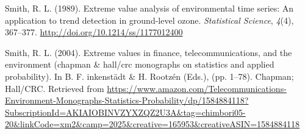 \documentclass[12pt,oneside]{reedthesis}
\begin{document}
\leavevmode\hypertarget{ref-Smith1989}{}%
Smith, R. L. (1989). Extreme value analysis of environmental time series: An application to trend detection in ground-level ozone. \emph{Statistical Science}, \emph{4}(4), 367--377. \url{http://doi.org/10.1214/ss/1177012400}

\leavevmode\hypertarget{ref-Smith2004}{}%
Smith, R. L. (2004). Extreme values in finance, telecommunications, and the environment (chapman \& hall/crc monographs on statistics and applied probability). In B. F. inkenstädt \& H. Rootzén (Eds.), (pp. 1--78). Chapman; Hall/CRC. Retrieved from \url{https://www.amazon.com/Telecommunications-Environment-Monographs-Statistics-Probability/dp/1584884118?SubscriptionId=AKIAIOBINVZYXZQZ2U3A\&tag=chimbori05-20\&linkCode=xm2\&camp=2025\&creative=165953\&creativeASIN=1584884118}


\end{document}
